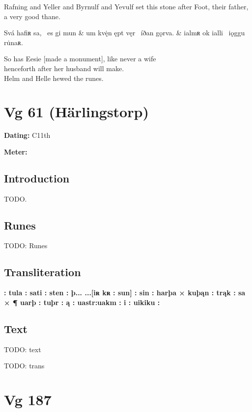 \bpb Rafning and Yeller and Byrnulf and Yevulf set this stone after Foot, their father, a very good thane.\epb\epg

\bvg\bva[][2]%
Svá hafiʀ sa, \hld\ es gi mun &
um kvę̇n ępt vęr \hld\ íðan gǫrva. &
ialmʀ ok ialli \hld\ iǫggu ru̇naʀ.\eva

\bvb So has Eesie [made a monument], like never a wife \\
henceforth after her husband will make. \\
Helm and Helle hewed the runes.\evb\evg

\sectionline\clearpage


\section{Vg 61 (Härlingstorp)}

\begin{flushright}%
\textbf{Dating:} C11th

\textbf{Meter:} \Fornyrdislag
\end{flushright}%

\subsection{Introduction}

TODO.

\subsection{Runes}

TODO: Runes%

\subsection{Transliteration}

\textbf{: tula : sati : sten : þ... ...[iʀ kʀ : sun] : sin : harþa × kuþąn : trąk : sa × ¶ uarþ : tuþr : ą : uastr:uakm : i : uikiku :}

\subsection{Text}

\bpg\bpa[0]%
TODO: text\epa

\bpb TODO: trans\epb\epg

\sectionline\clearpage


\section{Vg 187}

